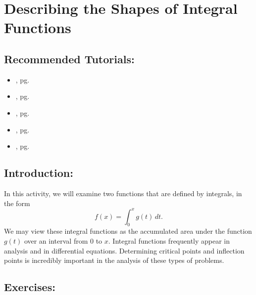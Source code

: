 \section{Describing the Shapes of Integral Functions}
\label{sec:max_and_min_problems_for_integrals}	

\subsection*{Recommended Tutorials:}
\begin{itemize}[noitemsep]
	\item {}, pg. \pageref{chp:assignment_operator}
	\item {}, pg. \pageref{chp:equation_solvers}
	\item {}, pg. \pageref{chp:limits}
	\item {}, pg. \pageref{chp:derivative}
	\item {}, pg. \pageref{chp:definite_and_indefinite_Integrals}
\end{itemize}

\subsection*{Introduction:}

In this activity, we will examine two functions that are defined by integrals, in the form
\[ f(x) = \int_0^x g(t) \, dt.\] 
We may view these integral functions as the accumulated area under the function $g(t)$ over an interval from $0$ to $x$. Integral functions frequently appear in analysis and in differential equations.  Determining critical points and inflection points is incredibly important in the analysis of these types of problems.

\subsection*{Exercises:}

